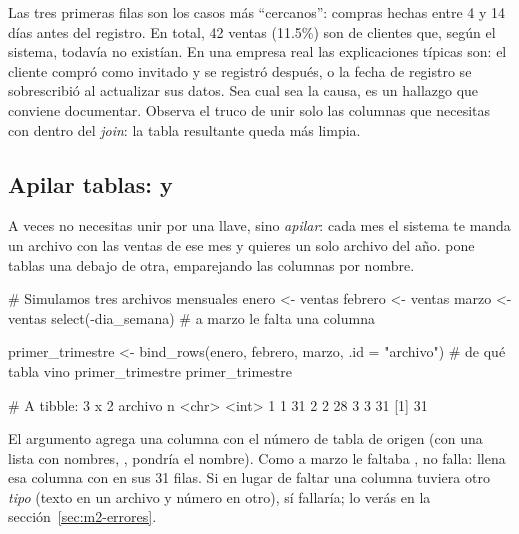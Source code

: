 Las tres primeras filas son los casos más ``cercanos'': compras hechas
entre 4 y 14 días antes del registro. En total, 42 ventas (11.5\%) son de
clientes que, según el sistema, todavía no existían. En una empresa real las explicaciones típicas son: el cliente
compró como invitado y se registró después, o la fecha de registro se
sobrescribió al actualizar sus datos. Sea cual sea la causa, es un hallazgo
que conviene documentar. Observa el truco de unir solo las columnas que
necesitas con  dentro del \emph{join}: la tabla resultante
queda más limpia.

\subsection{Apilar tablas: \texorpdfstring{}{bind\_rows()} y \texorpdfstring{}{bind\_cols()}}

A veces no necesitas unir por una llave, sino \emph{apilar}: cada mes el
sistema te manda un archivo con las ventas de ese mes y quieres un solo
archivo del año.  pone tablas una debajo de otra,
emparejando las columnas por nombre.

\begin{rcode}
# Simulamos tres archivos mensuales
enero   <- ventas %
febrero <- ventas %
marzo   <- ventas %
  select(-dia_semana)               # a marzo le falta una columna

primer_trimestre <- bind_rows(enero, febrero, marzo,
                              .id = "archivo")   # de qué tabla vino
primer_trimestre %
primer_trimestre %
\end{rcode}
\begin{rsalida}
# A tibble: 3 x 2
  archivo     n
  <chr>   <int>
1 1          31
2 2          28
3 3          31
[1] 31
\end{rsalida}

El argumento  agrega una columna con el número de tabla de
origen (con una lista con nombres, ,
pondría el nombre). Como a marzo le faltaba ,
 no falla: llena esa columna con  en sus 31
filas. Si en lugar de faltar una columna tuviera otro \emph{tipo} (texto en
un archivo y número en otro), sí fallaría; lo verás en la
sección~\ref{sec:m2-errores}.

